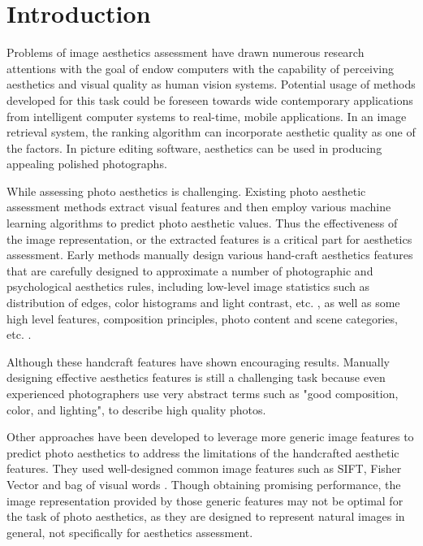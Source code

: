 \documentclass[10pt,twocolumn,letterpaper]{article}
\begin{document}
\section{Introduction}
Problems of image aesthetics assessment 
have drawn numerous research attentions with the goal of 
endow computers with the capability of perceiving aesthetics and
visual quality as human vision systems. Potential usage
of methods developed for this task could be foreseen
towards wide contemporary applications from intelligent computer
systems to real-time, mobile applications. In an image retrieval 
system, the ranking algorithm can incorporate aesthetic quality 
as one of the factors. In picture editing software, aesthetics can be
used in producing appealing polished photographs.

While assessing photo aesthetics is challenging. Existing photo aesthetic
assessment methods extract visual features and then employ various machine 
learning algorithms to predict photo aesthetic values. Thus the effectiveness 
of the image representation, or the extracted features is a critical part 
for aesthetics assessment. Early methods manually design various hand-craft 
aesthetics features that are carefully designed to approximate a number of 
photographic and psychological aesthetics rules, including low-level image 
statistics such as distribution of edges, color histograms and light contrast, 
etc. \cite{Luo:2008:ECCV} \cite{Bhattacharya:2010:ACMMM} \cite{Cohen-Or:2006:SIGGRAPH}, 
as well as some high level features, composition principles, photo content 
and scene categories, etc.\cite{Tang:2013:TMM} \cite{Sagnik:2011:CVPR}.

Although these handcraft features have shown encouraging 
results. Manually designing effective aesthetics
features is still a challenging task because even experienced
photographers use very abstract terms such as "good composition,
color, and lighting", to describe high quality photos. 

Other approaches have been developed to leverage more 
generic image features to predict photo aesthetics to 
address the limitations of the handcrafted aesthetic features. 
They used well-designed common image features such as SIFT, Fisher Vector 
\cite{Marchesotti:2011:ICCV} \cite{Perronnin:2010:ECCV}  
and bag of visual words \cite{Su:2011:ACMMM}. Though obtaining
promising performance, the image representation provided
by those generic features may not be optimal for the 
task of photo aesthetics, as they are designed to represent natural images in
general, not specifically for aesthetics assessment.
\end{document}
